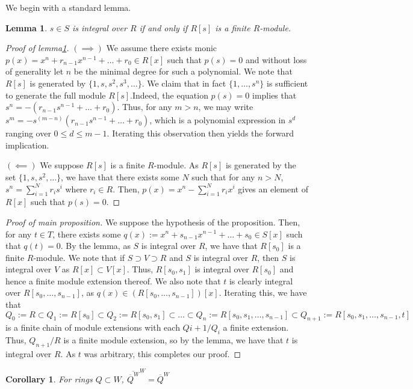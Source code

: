 \documentclass[english]{article}
\newenvironment{subproof}[1][\proofname]{%
	\renewcommand{\qedsymbol}{$\blacksquare$}%
	\begin{proof}[#1]%
	}{%
	\end{proof}%
}
\newtheorem*{corollary*}{Corollary}
\newtheorem{lemma}[theorem]{Lemma}
\theoremstyle{remark}
\theoremstyle{definition}
\begin{document}
	We begin with a standard lemma.\begin{lemma}\label{finint}
	 $s\in S$ is integral over $R$ if and only if $R[s]$ is a finite $R$-module.
	\end{lemma}
\begin{subproof}[Proof of lemma\ref{finint}]
	$(\implies)$ We assume there exists monic $p(x)=x^n+r_{n-1}x^{n-1}+\hdots+r_0\in R[x]$ such that $p(s)=0$ and without loss of generality let $n$ be the minimal degree for such a polynomial. We note that $R[s]$ is generated by $\{1,s,s^2,s^3,\hdots\}$. We claim that in fact $\{1,\hdots,s^n\}$ is sufficient to generate the full module $R[s]$.Indeed, the equation $p(s)=0$ implies that $s^n=-(r_{n-1}s^{n-1}+\hdots +r_0)$. Thus, for any $m>n$, we may write $s^m=-s^(m-n)(r_{n-1}s^{n-1}+\hdots +r_0)$, which is a polynomial expression in $s^d$ ranging over $0\leq d \leq m-1$. Iterating this observation then yields the forward implication.

$(\impliedby)$ We suppose $R[s]$ is a finite $R$-module. As $R[s]$ is generated by the set $\{1,s,s^2,\hdots\}$, we have that there exists some $N$ such that for any $n>N$, $s^n=\sum_{i=1}^N r_is^i$ where $r_i\in R$. Then, $p(x)=x^n-\sum_{i=1}^Nr_ix^i$ gives an element of $R[x]$ such that $p(s)=0$. \end{subproof}
\begin{proof}[Proof of main proposition]
	We suppose the hypothesis of the proposition. Then, for any $t\in T$, there exists some $q(x):=x^n+s_{n-1}x^{n-1}+\hdots+s_0\in S[x]$ such that $q(t)=0$. By the lemma, as $S$ is integral over $R$, we have that $R[s_0]$ is a finite $R$-module. We note that if $S\supset V\supset R$ and $S$ is integral over $R$, then $S$ is integral over $V$ as $R[x]\subset V[x]$. Thus, $R[s_0,s_1]$ is integral over $R[s_0]$ and hence a finite module extension thereof. We also note that $t$ is clearly integral over $R[s_0,\hdots,s_{n-1}]$, as $q(x)\in \left(R[s_0,\hdots,s_{n-1}]\right)[x]$. Iterating this, we have that $Q_0:=R\subset Q_1:=R[s_0]\subset Q_2:=R[s_0,s_1]\subset \hdots\subset Q_n:=R[s_0,s_1,\hdots, s_{n-1}]\subset Q_{n+1}:=R[s_0,s_1,\hdots, s_{n-1},t]$ is a finite chain of module extensions with each $Q{i+1}/Q_i$ a finite extension. Thus, $Q_{n+1}/R$ is a finite module extension, so by the lemma, we have that $t$ is integral over $R$. As $t$ was arbitrary, this completes our proof.
\end{proof}
\begin{corollary*} For rings $Q\subset W$, 
${\overline{{\overline{Q}}^W}^W=\overline{Q}^W}$
\end{corollary*}
\end{document}
